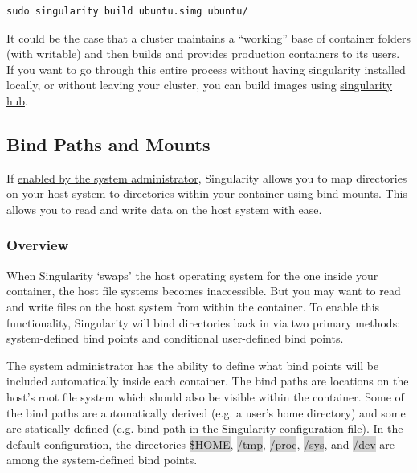 \documentclass[a4paper]{article}
\newcounter{subsubsubsection}[subsubsection]
\begin{document}
\begin{lstlisting}[frame=single]
sudo singularity build ubuntu.simg ubuntu/  
\end{lstlisting}		

It could be the case that a cluster maintains a “working” base of container folders (with writable) and then builds and provides production containers to its users.\\[0.1in]

If you want to go through this entire process without having singularity installed locally, or without leaving your cluster, you can build images using \href{https://github.com/singularityhub/singularityhub.github.io/wiki}{singularity hub}.
		
\subsection{Bind Paths and Mounts}
\label{sec:bindpaths}

If \href{http://singularity.lbl.gov/docs-config#user-bind-control-boolean-defaultyes}{enabled by the system administrator}, Singularity allows you to map directories on your host system to directories within your container using bind mounts. This allows you to read and write data on the host system with ease.

\subsubsection{Overview}

When Singularity ‘swaps’ the host operating system for the one inside your container, the host file systems becomes inaccessible. But you may want to read and write files on the host system from within the container. To enable this functionality, Singularity will bind directories back in via two primary methods: system-defined bind points and conditional user-defined bind points.

	
	The system administrator has the ability to define what bind points will be included automatically inside each container. The bind paths are locations on the host’s root file system which should also be visible within the container. Some of the bind paths are automatically derived (e.g. a user’s home directory) and some are statically defined (e.g. bind path in the Singularity configuration file). In the default configuration, the directories \colorbox{lightgray}{\$HOME}, \colorbox{lightgray}{/tmp}, \colorbox{lightgray}{/proc}, \colorbox{lightgray}{/sys}, and \colorbox{lightgray}{/dev} are among the system-defined bind points.
\end{document}
